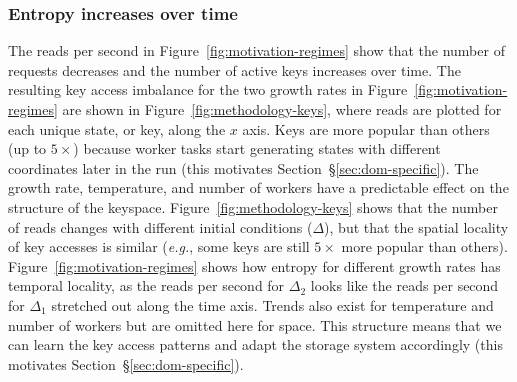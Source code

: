 \subsubsection*{Entropy increases over time} The reads per second in
Figure~\ref{fig:motivation-regimes} show that the number of requests decreases
and the number of active keys increases over time. The resulting key access
imbalance for the two growth rates in Figure~\ref{fig:motivation-regimes} are
shown in Figure~\ref{fig:methodology-keys}, where reads are plotted for each
unique state, or key, along the \(x\) axis. Keys are more popular than others
(up to \(5\times\)) because worker tasks start generating states with different
coordinates later in the run (this motivates Section~\S\ref{sec:dom-specific}).
The growth rate, temperature, and number of workers have a predictable effect
on the structure of the keyspace.  Figure~\ref{fig:methodology-keys} shows that
the number of reads changes with different initial conditions (\(\Delta\)), but
that the spatial locality of key accesses is similar ({\it e.g.}, some keys are
still \(5\times\) more popular than others).
Figure~\ref{fig:motivation-regimes} shows how entropy for different growth
rates has temporal locality, as the reads per second for \(\Delta_2\) looks
like the reads per second for \(\Delta_1\) stretched out along the time axis.
Trends also exist for temperature and number of workers but are omitted here
for space. This structure means that we can learn the key access patterns and adapt the
storage system accordingly (this motivates Section~\S\ref{sec:dom-specific}).
